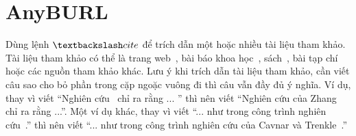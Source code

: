 \section{AnyBURL}

Dùng lệnh $\textbackslash cite$ để trích dẫn một hoặc nhiều tài liệu tham khảo.
Tài liệu tham khảo có thể là trang web~\cite{Listings,HDLVThS}, bài báo khoa học~\cite{1994-Cavnar}, sách~\cite{1984-TeX-Knuth,2006-DDien,2006-NPTV}, bài tạp chí~\cite{1989-TED} hoặc các nguồn tham khảo khác. 
Lưu ý khi trích dẫn tài liệu tham khảo, cần viết câu sao cho bỏ phần trong cặp ngoặc vuông đi thì câu vẫn đầy đủ ý nghĩa.
Ví dụ, thay vì viết ``Nghiên cứu~\cite{1989-TED} chỉ ra rằng ... '' thì nên viết ``Nghiên cứu của Zhang~\cite{1989-TED} chỉ ra rằng ...''.
Một ví dụ khác, thay vì viết ``... như trong công trình nghiên cứu~\cite{1994-Cavnar}.'' thì nên viết ``... như trong công trình nghiên cứu của Cavnar và Trenkle~\cite{1994-Cavnar}.''

